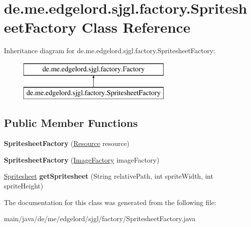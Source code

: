 \hypertarget{classde_1_1me_1_1edgelord_1_1sjgl_1_1factory_1_1_spritesheet_factory}{}\section{de.\+me.\+edgelord.\+sjgl.\+factory.\+Spritesheet\+Factory Class Reference}
\label{classde_1_1me_1_1edgelord_1_1sjgl_1_1factory_1_1_spritesheet_factory}
Inheritance diagram for de.\+me.\+edgelord.\+sjgl.\+factory.\+Spritesheet\+Factory\+:\begin{figure}[H]
\begin{center}
\leavevmode
\includegraphics[height=2.000000cm]{classde_1_1me_1_1edgelord_1_1sjgl_1_1factory_1_1_spritesheet_factory}
\end{center}
\end{figure}
\subsection*{Public Member Functions}
\begin{DoxyCompactItemize}
\item 
\mbox{\label{classde_1_1me_1_1edgelord_1_1sjgl_1_1factory_1_1_spritesheet_factory_a63e0432fcf964651c26ea85a6e2ac959}} 
{\bfseries Spritesheet\+Factory} (\mbox{\hyperlink{interfacede_1_1me_1_1edgelord_1_1sjgl_1_1resource_1_1_resource}{Resource}} resource)
\item 
\mbox{\label{classde_1_1me_1_1edgelord_1_1sjgl_1_1factory_1_1_spritesheet_factory_af7432810933bc17cd5bee3fefa7998aa}} 
{\bfseries Spritesheet\+Factory} (\mbox{\hyperlink{classde_1_1me_1_1edgelord_1_1sjgl_1_1factory_1_1_image_factory}{Image\+Factory}} image\+Factory)
\item 
\mbox{\label{classde_1_1me_1_1edgelord_1_1sjgl_1_1factory_1_1_spritesheet_factory_adb91a81ed7bea81ba827a4cd734f197d}} 
\mbox{\hyperlink{classde_1_1me_1_1edgelord_1_1sjgl_1_1cosmetic_1_1_spritesheet}{Spritesheet}} {\bfseries get\+Spritesheet} (String relative\+Path, int sprite\+Width, int sprite\+Height)
\end{DoxyCompactItemize}


The documentation for this class was generated from the following file\+:\begin{DoxyCompactItemize}
\item 
main/java/de/me/edgelord/sjgl/factory/Spritesheet\+Factory.\+java\end{DoxyCompactItemize}
